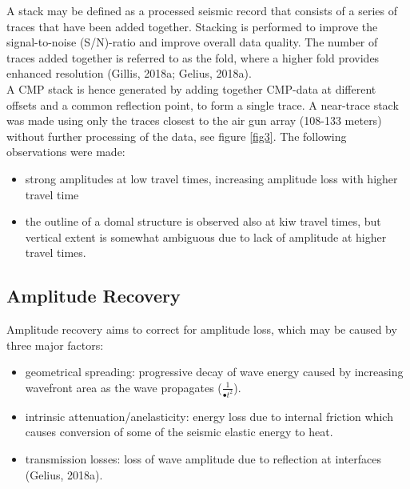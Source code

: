 \documentclass[10pt,a4paper]{article}
\begin{document}
A stack may be defined as a processed seismic record that consists of a series of traces that have been added together. Stacking is performed to improve the signal-to-noise (S/N)-ratio and improve overall data quality. The number of traces added together is referred to as the fold, where a higher fold provides enhanced resolution (Gillis, 2018a; Gelius, 2018a).
\\
A CMP stack is hence generated by adding together CMP-data at different offsets and a common reflection point, to form a single trace. A near-trace stack was made using only the traces closest to the air gun array (108-133 meters) without further processing of the data, see figure \ref{fig3}. The following observations were made:

\begin{itemize}
    \item strong amplitudes at low travel times, increasing amplitude loss with higher travel time
    \item the outline of a domal structure is observed also at kiw travel times, but vertical extent is somewhat ambiguous due to lack of amplitude at higher travel times.
\end{itemize}

\subsection{Amplitude Recovery}

Amplitude recovery aims to correct for amplitude loss, which may be caused by three major factors:

\begin{itemize}
    \item geometrical spreading: progressive decay of wave energy caused by increasing wavefront area as the wave propagates ($\frac{1}{•t^2}$).
    \item intrinsic attenuation/anelasticity: energy loss due to internal friction which causes conversion of some of the seismic elastic energy to heat.
    \item transmission losses: loss of wave amplitude due to reflection at interfaces (Gelius, 2018a).
\end{itemize}
\end{document}
